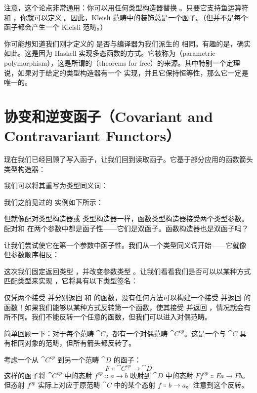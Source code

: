 注意，这个论点非常通用：你可以用任何类型构造器替换 。只要它支持鱼运算符和 ，你就可以定义 。因此，Kleisli 范畴中的装饰总是一个函子。（但并不是每个函子都会产生一个 Kleisli 范畴。）

你可能想知道我们刚才定义的  是否与编译器为我们派生的  相同。有趣的是，确实如此。这是因为 Haskell 实现多态函数的方式。它被称为（parametric polymorphism），这是所谓的（theorems for free）的来源。其中特别一个定理说，如果对于给定的类型构造器有一个  实现，并且它保持恒等性，那么它一定是唯一的。

\section{协变和逆变函子（Covariant and Contravariant Functors）}

现在我们已经回顾了写入函子，让我们回到读取函子。它基于部分应用的函数箭头类型构造器：

我们可以将其重写为类型同义词：

我们之前见过的  实例如下所示：

但就像配对类型构造器或  类型构造器一样，函数类型构造器接受两个类型参数。配对和  在两个参数中都是函子性——它们是双函子。函数构造器也是双函子吗？

让我们尝试使它在第一个参数中函子性。我们从一个类型同义词开始——它就像  但参数顺序相反：

这次我们固定返回类型 ，并改变参数类型 。让我们看看我们是否可以以某种方式匹配类型来实现 ，它将具有以下类型签名：

仅凭两个接受  并分别返回  和  的函数，没有任何方法可以构建一个接受  并返回  的函数！如果我们能够以某种方式反转第一个函数，使其接受  并返回 ，情况就会有所不同。我们不能反转一个任意的函数，但我们可以进入对偶范畴。

简单回顾一下：对于每个范畴 $\cat{C}$，都有一个对偶范畴 $\cat{C}^\mathit{op}$。这是一个与 $\cat{C}$ 具有相同对象的范畴，但所有箭头都反转了。

考虑一个从 $\cat{C}^\mathit{op}$ 到另一个范畴 $\cat{D}$ 的函子：
\[F \Colon \cat{C}^\mathit{op} \to \cat{D}\]
这样的函子将 $\cat{C}^\mathit{op}$ 中的态射 $f^\mathit{op} \Colon a \to b$ 映射到 $\cat{D}$ 中的态射 $F f^\mathit{op} \Colon F a \to F b$。但态射 $f^\mathit{op}$ 实际上对应于原范畴 $\cat{C}$ 中的某个态射 $f \Colon b \to a$。注意到这个反转。

